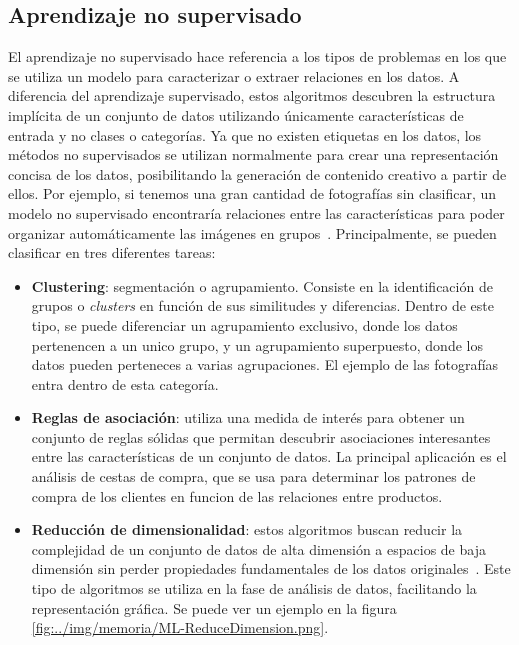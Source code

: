 \subsection{Aprendizaje no supervisado}
El aprendizaje no supervisado hace referencia a los tipos de problemas en los que se utiliza un modelo para caracterizar o extraer relaciones en los datos.
A diferencia del aprendizaje supervisado, estos algoritmos descubren la estructura implícita de un conjunto de datos utilizando únicamente características de entrada y no clases o categorías. 
Ya que no existen etiquetas en los datos, los métodos no supervisados se utilizan normalmente para crear una representación concisa de los datos, posibilitando la generación de contenido creativo a partir de ellos. Por ejemplo, si tenemos una gran cantidad de fotografías sin clasificar, un modelo no supervisado encontraría relaciones entre las características para poder organizar automáticamente las imágenes en grupos~\cite{USL:guide}.
Principalmente, se pueden clasificar en tres diferentes tareas:
\begin{itemize}
	\item \textbf{Clustering}: segmentación o agrupamiento. Consiste en la identificación de grupos o \textit{clusters} en función de sus similitudes y diferencias. Dentro de este tipo, se puede diferenciar un agrupamiento exclusivo, donde los datos pertenencen a un unico grupo, y un agrupamiento superpuesto, donde los datos pueden perteneces a varias agrupaciones. El ejemplo de las fotografías entra dentro de esta categoría.
	\item \textbf{Reglas de asociación}: utiliza una medida de interés para obtener un conjunto de reglas sólidas que permitan descubrir asociaciones interesantes entre las características de un conjunto de datos. La principal aplicación es el \guillemetleft análisis de cestas de compra\guillemetright, que se usa para determinar los patrones de compra de los clientes en funcion de las relaciones entre productos.
	\item \textbf{Reducción de dimensionalidad}: estos algoritmos buscan reducir la complejidad de un conjunto de datos de alta dimensión a espacios de baja dimensión sin perder propiedades fundamentales de los datos originales~\cite{PCA}. Este tipo de algoritmos se utiliza en la fase de análisis de datos, facilitando la representación gráfica. Se puede ver un ejemplo en la figura \ref{fig:../img/memoria/ML-ReduceDimension.png}.
\end{itemize}


